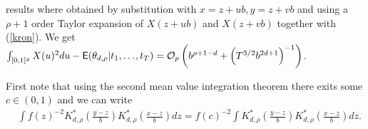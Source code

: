 results where obtained by substitution with $x=z+ub, y=z+vb$ and using a $\rho+1$ order Taylor expansion of $X(z+ub)$ and $X(z+vb)$ together with (\ref{kron}). We get $ \int_{[0,1]^g} X(u)^2 du - \mathop{\mbox{\sf E}} (\theta_{d,\rho}|  t_1, \ldots{\kern -1pt}, t_T) = \mathcal{O}_p \left( b^{\rho+1-d} + \left(T^{3/2} b^{2d+1}\right)^{-1} \right)$.%

%
%
First note that using the second mean value integration theorem there exits some $c \in (0,1)$ and we can write
\begin{equation}
\begin{split}
	& \int f(z)^{-2} K_{d,\rho}^*\left( \frac{y-z}{b} \right) K_{d,\rho}^*\left(\frac{x-z}{b} \right) dz  = 	
	 f(c)^{-2} \int  K_{d,\rho}^*\left(\frac{y-z}{b} \right) K_{d,\rho}^*\left(\frac{x-z}{b}\right) dz.
\end{split}
\end{equation}

